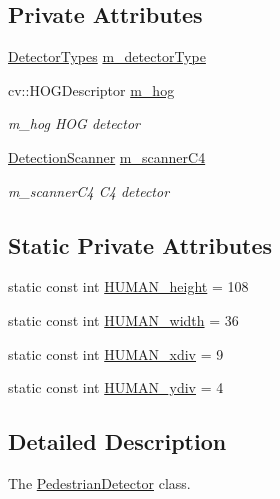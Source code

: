 \subsection*{Private Attributes}
\begin{DoxyCompactItemize}
\item 
\mbox{\hyperlink{class_pedestrian_detector_aa2136624089c144b4ef5f3598de00d8c}{Detector\+Types}} \mbox{\hyperlink{class_pedestrian_detector_a4e0492d82780eb31f763972173d56d9d}{m\+\_\+detector\+Type}}
\item 
cv\+::\+H\+O\+G\+Descriptor \mbox{\hyperlink{class_pedestrian_detector_ad00796408688b6465fb988796536680d}{m\+\_\+hog}}
\begin{DoxyCompactList}\small\item\em m\+\_\+hog H\+OG detector \end{DoxyCompactList}\item 
\mbox{\hyperlink{class_detection_scanner}{Detection\+Scanner}} \mbox{\hyperlink{class_pedestrian_detector_a68a45a369623a3492065bdf29e81b29c}{m\+\_\+scanner\+C4}}
\begin{DoxyCompactList}\small\item\em m\+\_\+scanner\+C4 C4 detector \end{DoxyCompactList}\end{DoxyCompactItemize}
\subsection*{Static Private Attributes}
\begin{DoxyCompactItemize}
\item 
static const int \mbox{\hyperlink{class_pedestrian_detector_a600b0da8ac472bcd8cb8aeb0e9f87eb7}{H\+U\+M\+A\+N\+\_\+height}} = 108
\item 
static const int \mbox{\hyperlink{class_pedestrian_detector_afa7733c965e2d44d6908309b33201d90}{H\+U\+M\+A\+N\+\_\+width}} = 36
\item 
static const int \mbox{\hyperlink{class_pedestrian_detector_acdc72a22ba921457147c613ac874b3ed}{H\+U\+M\+A\+N\+\_\+xdiv}} = 9
\item 
static const int \mbox{\hyperlink{class_pedestrian_detector_ab2626952044b310482883b506023e6a7}{H\+U\+M\+A\+N\+\_\+ydiv}} = 4
\end{DoxyCompactItemize}


\subsection{Detailed Description}
The \mbox{\hyperlink{class_pedestrian_detector}{Pedestrian\+Detector}} class. 

